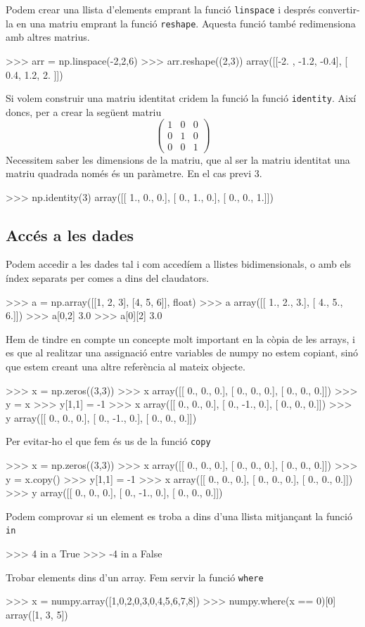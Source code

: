 Podem crear una llista d'elements emprant la funció {\tt linspace} i després convertir-la en una matriu emprant la funció {\tt reshape}. Aquesta funció també redimensiona amb altres matrius.
\begin{tip}[caption=Combinació de linspace() i reshape()]
>>> arr = np.linspace(-2,2,6)
>>> arr.reshape((2,3))
array([[-2. , -1.2, -0.4],
       [ 0.4,  1.2,  2. ]])
\end{tip}
Si volem construir una matriu identitat cridem la funció la funció {\tt identity}. Així doncs, per a crear la següent matriu
\[ \left( \begin{array}{ccc}
1 & 0 & 0 \\
0 & 1 & 0 \\
0 & 0 & 1 \end{array} \right)\] 
Necessitem saber les dimensions de la matriu, que al ser la matriu identitat una matriu quadrada només és un paràmetre. En el cas previ 3.
\begin{blockcode}
>>> np.identity(3)
array([[ 1.,  0.,  0.],
       [ 0.,  1.,  0.],
       [ 0.,  0.,  1.]])
\end{blockcode}
\subsection{Accés a les dades}
Podem accedir a les dades tal i com accedíem a llistes bidimensionals, o amb els índex separats per comes a dins del claudators.
\begin{blockcode}
>>> a = np.array([[1, 2, 3], [4, 5, 6]], float)
>>> a
array([[ 1.,  2.,  3.],
       [ 4.,  5.,  6.]])
>>> a[0,2]
3.0
>>> a[0][2]
3.0
\end{blockcode}
Hem de tindre en compte un concepte molt important en la còpia de les arrays, i es que al realitzar una assignació entre variables de numpy no estem copiant, sinó que estem creant una altre referència al mateix objecte.
\begin{blockcode}
>>> x = np.zeros((3,3))
>>> x
array([[ 0.,  0.,  0.],
       [ 0.,  0.,  0.],
       [ 0.,  0.,  0.]])
>>> y = x
>>> y[1,1] = -1
>>> x
array([[ 0.,  0.,  0.],
       [ 0., -1.,  0.],
       [ 0.,  0.,  0.]])
>>> y
array([[ 0.,  0.,  0.],
       [ 0., -1.,  0.],
       [ 0.,  0.,  0.]])
\end{blockcode}
Per evitar-ho el que fem és us de la funció {\tt copy}
\begin{tip}[caption=Còpia per valor mitjançant la funció copy()]
>>> x = np.zeros((3,3))
>>> x
array([[ 0.,  0.,  0.],
       [ 0.,  0.,  0.],
       [ 0.,  0.,  0.]])
>>> y = x.copy()
>>> y[1,1] = -1
>>> x
array([[ 0.,  0.,  0.],
       [ 0.,  0.,  0.],
       [ 0.,  0.,  0.]])
>>> y
array([[ 0.,  0.,  0.],
       [ 0., -1.,  0.],
       [ 0.,  0.,  0.]])
\end{tip}
Podem comprovar si un element es troba a dins d'una llista mitjançant la funció {\tt in}
\begin{blockcode}
>>> 4 in a
True
>>> -4 in a
False
\end{blockcode}
Trobar elements dins d'un array. Fem servir la funció {\tt where}
\begin{blockcode}
>>> x = numpy.array([1,0,2,0,3,0,4,5,6,7,8])
>>> numpy.where(x == 0)[0]
array([1, 3, 5])
\end{blockcode}
